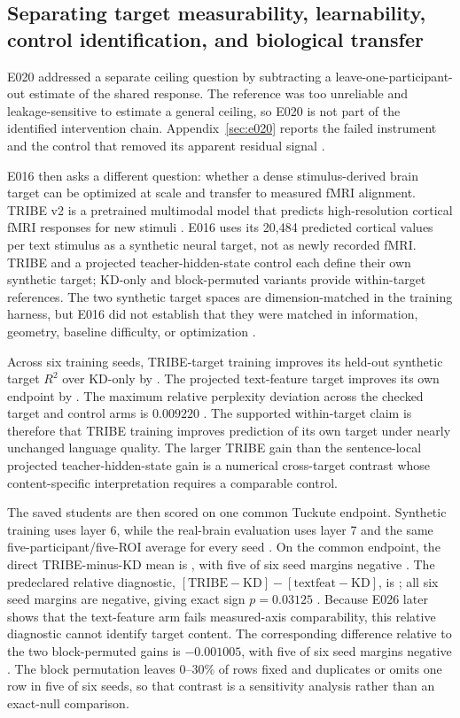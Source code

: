 \subsection{Separating target measurability, learnability, control identification, and biological transfer}
\label{sec:results-synthetic}

E020 addressed a separate ceiling question by subtracting a leave-one-participant-out estimate of the shared response.
The reference was too unreliable and leakage-sensitive to estimate a general ceiling, so E020 is not part of the identified intervention chain.
Appendix~\ref{sec:e020} reports the failed instrument and the control that removed its apparent residual signal .

E016 then asks a different question: whether a dense stimulus-derived brain target can be optimized at scale and transfer to measured fMRI alignment.
TRIBE v2 is a pretrained multimodal model that predicts high-resolution cortical fMRI responses for new stimuli \autocite{dascoli2026}.
E016 uses its 20,484 predicted cortical values per text stimulus as a synthetic neural target, not as newly recorded fMRI.
TRIBE and a projected teacher-hidden-state control each define their own synthetic target; KD-only and block-permuted variants provide within-target references.
The two synthetic target spaces are dimension-matched in the training harness, but E016 did not establish that they were matched in information, geometry, baseline difficulty, or optimization .

Across six training seeds, TRIBE-target training improves its held-out synthetic target $R^2$ over KD-only by .
The projected text-feature target improves its own endpoint by  .
The maximum relative perplexity deviation across the checked target and control arms is $0.009220$ .
The supported within-target claim is therefore that TRIBE training improves prediction of its own target under nearly unchanged language quality.
The larger TRIBE gain than the sentence-local projected teacher-hidden-state gain is a numerical cross-target contrast whose content-specific interpretation requires a comparable control.

The saved students are then scored on one common Tuckute endpoint.
Synthetic training uses layer 6, while the real-brain evaluation uses layer 7 and the same five-participant/five-ROI average for every seed .
On the common endpoint, the direct TRIBE-minus-KD mean is , with five of six seed margins negative .
The predeclared relative diagnostic, $[\mathrm{TRIBE}-\mathrm{KD}]-[\mathrm{textfeat}-\mathrm{KD}]$, is ; all six seed margins are negative, giving exact sign $p=0.03125$ .
Because E026 later shows that the text-feature arm fails measured-axis comparability, this relative diagnostic cannot identify target content.
The corresponding difference relative to the two block-permuted gains is $-0.001005$, with five of six seed margins negative .
The block permutation leaves 0--30\% of rows fixed and duplicates or omits one row in five of six seeds, so that contrast is a sensitivity analysis rather than an exact-null comparison.

